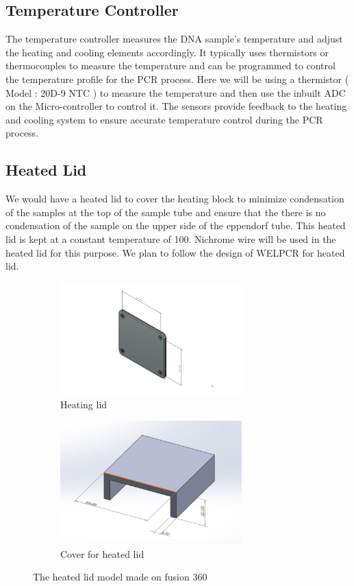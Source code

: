 \documentclass{article}
\begin{document}
\subsection{Temperature Controller}
The temperature controller measures the DNA sample's temperature and adjust the heating and cooling elements accordingly. It typically uses thermistors or thermocouples to measure the temperature and can be programmed to control the temperature profile for the PCR process. Here we will be using a thermistor ( Model : 20D-9 NTC ) to measure the temperature and then use the inbuilt ADC on the Micro-controller to control it. The sensors provide feedback to the heating and cooling system to ensure accurate temperature control during the PCR process.

\subsection{Heated Lid}
We would have a heated lid to cover the heating block to minimize condensation of the samples at the top of the sample tube and ensure that the there is no condensation of the sample on the upper side of the eppendorf tube. This heated lid is kept at a constant temperature of 100. Nichrome wire will be used in the heated lid for this purpose. We plan to follow the design of WELPCR for heated lid.



\begin{figure}[htp]
    \centering
    \begin{subfigure}[b]{0.4\textwidth}
    \centering
    \includegraphics[width=7cm]{Images/Heatedlid1.png}
    \caption{Heating lid}
    \end{subfigure}
    \hfill
    \begin{subfigure}[b]{0.5\textwidth}
    \centering
    \includegraphics[width=7cm]{Images/heatinglid2.jpeg}
    \caption{Cover for heated lid}
    \end{subfigure}
    \caption{The heated lid model made on fusion 360}
    \label{fig:galaxy}
\end{figure}
\end{document}
